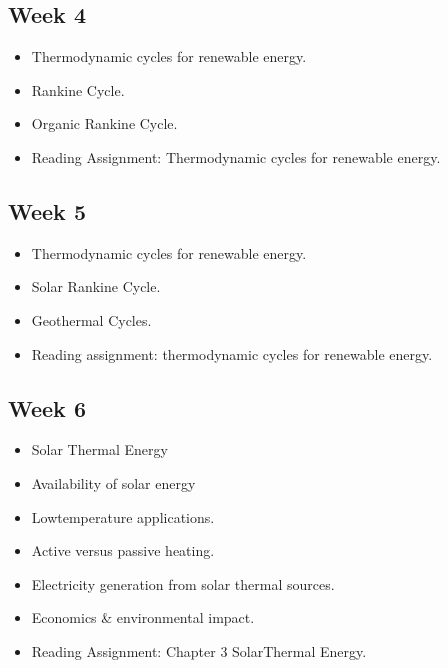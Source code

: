\documentclass[letterpaper,10pt,english]{jupyterBook}
\begin{document}
\subsection{Week 4}
\label{\detokenize{Syllabus:week-4}}\begin{itemize}
\item {} 
\sphinxAtStartPar
Thermodynamic cycles for renewable energy.

\item {} 
\sphinxAtStartPar
Rankine Cycle.

\item {} 
\sphinxAtStartPar
Organic Rankine Cycle.

\item {} 
\sphinxAtStartPar
Reading Assignment: \sphinxhyphen{} Thermodynamic cycles for renewable energy.

\end{itemize}


\subsection{Week 5}
\label{\detokenize{Syllabus:week-5}}\begin{itemize}
\item {} 
\sphinxAtStartPar
Thermodynamic cycles for renewable energy.

\item {} 
\sphinxAtStartPar
Solar Rankine Cycle.

\item {} 
\sphinxAtStartPar
Geothermal Cycles.

\item {} 
\sphinxAtStartPar
Reading assignment: thermodynamic cycles for renewable energy.

\end{itemize}


\subsection{Week 6}
\label{\detokenize{Syllabus:week-6}}\begin{itemize}
\item {} 
\sphinxAtStartPar
Solar Thermal Energy

\item {} 
\sphinxAtStartPar
Availability of solar energy

\item {} 
\sphinxAtStartPar
Low\sphinxhyphen{}temperature applications.

\item {} 
\sphinxAtStartPar
Active versus passive heating.

\item {} 
\sphinxAtStartPar
Electricity generation from solar thermal sources.

\item {} 
\sphinxAtStartPar
Economics \& environmental impact.

\item {} 
\sphinxAtStartPar
Reading Assignment: Chapter 3 \sphinxhyphen{} Solar\sphinxhyphen{}Thermal Energy.

\end{itemize}
\end{document}
